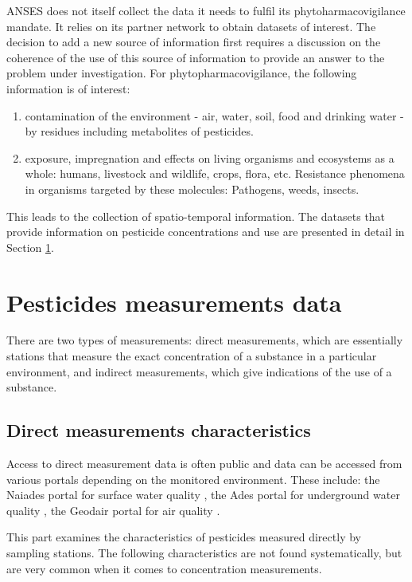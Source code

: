 ANSES does not itself collect the data it needs to fulfil its phytoharmacovigilance mandate. It relies on its partner network to obtain datasets of interest. The decision to add a new source of information first requires a discussion on the coherence of the use of this source of information to provide an answer to the problem under investigation. For phytopharmacovigilance, the following information is of interest: 
\begin{enumerate}
\item contamination of the environment - air, water, soil, food and drinking water - by residues including metabolites of pesticides.
\item exposure, impregnation and effects on living organisms and ecosystems as a whole: humans, livestock and wildlife, crops, flora, etc. Resistance phenomena in organisms targeted by these molecules: Pathogens, weeds, insects.
\end{enumerate}
This leads to the collection of spatio-temporal information. The datasets that provide information on pesticide concentrations and use are presented in detail in Section \ref{chp:2:3}.

\section{Pesticides measurements data}\label{chp:2:3}

There are two types of measurements: direct measurements, which are essentially stations that measure the exact concentration of a substance in a particular environment, and indirect measurements, which give indications of the use of a substance.

\subsection{Direct measurements characteristics}

Access to direct measurement data is often public and data can be accessed from various portals depending on the monitored environment. These include: the Naiades portal for surface water quality \citep{Naiade2}, the Ades portal for underground water quality \citep{Ades}, the Geodair portal for air quality \citep{Geodair}.
 
This part examines the characteristics of pesticides measured directly by sampling stations. The following characteristics are not found systematically, but are very common when it comes to concentration measurements.

